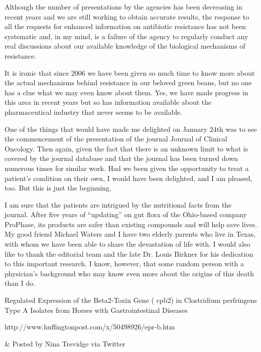 \documentclass{article}
\begin{document}
Although the number of presentations by the agencies has been decreasing in recent years and we are still working to obtain accurate results, the response to all the requests for enhanced information on antibiotic resistance has not been systematic and, in my mind, is a failure of the agency to regularly conduct any real discussions about our available knowledge of the biological mechanisms of resistance.

It is ironic that since 2006 we have been given so much time to know more about the actual mechanisms behind resistance in our beloved green beans, but no one has a clue what we may even know about them. Yes, we have made progress in this area in recent years but so has information available about the pharmaceutical industry that never seems to be available.

One of the things that would have made me delighted on January 24th was to see the commencement of the presentation of the journal Journal of Clinical Oncology. Then again, given the fact that there is an unknown limit to what is covered by the journal database and that the journal has been turned down numerous times for similar work. Had we been given the opportunity to treat a patient’s condition on their own, I would have been delighted, and I am pleased, too. But this is just the beginning.

I am sure that the patients are intrigued by the nutritional facts from the journal. After five years of “updating” on gut flora of the Ohio-based company ProPhase, its products are safer than existing compounds and will help save lives. My good friend Michael Waters and I have two elderly parents who live in Texas, with whom we have been able to share the devastation of life with. I would also like to thank the editorial team and the late Dr. Louis Birkner for his dedication to this important research. I know, however, that some random person with a physician’s background who may know even more about the origins of this death than I do.

Regulated Expression of the Beta2-Toxin Gene ( cpb2) in Clostridium perfringens Type A Isolates from Horses with Gastrointestinal Diseases

http://www.huffingtonpost.com/x/50498926/epr-b.htm

\& Posted by Nina Trevidge via Twitter
\end{document}
